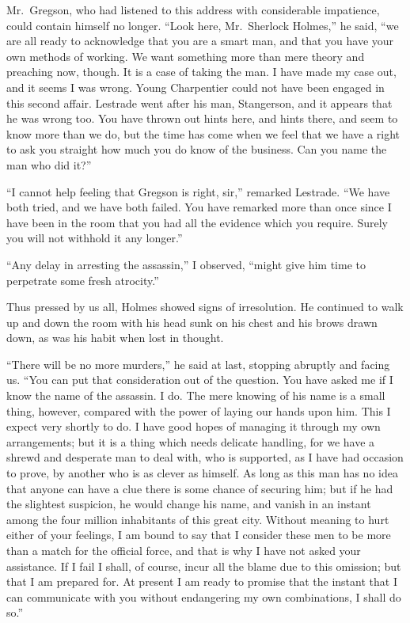 \documentclass[12pt,english,oneside]{book}
\begin{document}
Mr.\ Gregson, who had listened to this address with considerable
impatience, could contain himself no longer. {}``Look here, Mr.\ Sherlock
Holmes,'' he said, {}``we are all ready to acknowledge that you
are a smart man, and that you have your own methods of working. We
want something more than mere theory and preaching now, though. It
is a case of taking the man. I have made my case out, and it seems
I was wrong. Young Charpentier could not have been engaged in this
second affair. Lestrade went after his man, Stangerson, and it appears
that he was wrong too. You have thrown out hints here, and hints there,
and seem to know more than we do, but the time has come when we feel
that we have a right to ask you straight how much you do know of the
business. Can you name the man who did it?''

{}``I cannot help feeling that Gregson is right, sir,'' remarked
Lestrade. {}``We have both tried, and we have both failed. You have
remarked more than once since I have been in the room that you had
all the evidence which you require. Surely you will not withhold it
any longer.''

{}``Any delay in arresting the assassin,'' I observed, {}``might
give him time to perpetrate some fresh atrocity.''

Thus pressed by us all, Holmes showed signs of irresolution. He continued
to walk up and down the room with his head sunk on his chest and his
brows drawn down, as was his habit when lost in thought.

{}``There will be no more murders,'' he said at last, stopping abruptly
and facing us. {}``You can put that consideration out of the question.
You have asked me if I know the name of the assassin. I do. The mere
knowing of his name is a small thing, however, compared with the power
of laying our hands upon him. This I expect very shortly to do. I
have good hopes of managing it through my own arrangements; but it
is a thing which needs delicate handling, for we have a shrewd and
desperate man to deal with, who is supported, as I have had occasion
to prove, by another who is as clever as himself. As long as this
man has no idea that anyone can have a clue there is some chance of
securing him; but if he had the slightest suspicion, he would change
his name, and vanish in an instant among the four million inhabitants
of this great city. Without meaning to hurt either of your feelings,
I am bound to say that I consider these men to be more than a match
for the official force, and that is why I have not asked your assistance.
If I fail I shall, of course, incur all the blame due to this omission;
but that I am prepared for. At present I am ready to promise that
the instant that I can communicate with you without endangering my
own combinations, I shall do so.''
\end{document}
